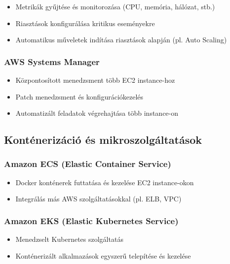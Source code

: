 \documentclass[a4paper,12pt]{article}
\begin{document}
    \begin{itemize}
        \item Metrikák gyűjtése és monitorozása (CPU, memória, hálózat, stb.)
        \item Riasztások konfigurálása kritikus eseményekre
        \item Automatikus műveletek indítása riasztások alapján (pl. Auto Scaling)
    \end{itemize}

    \subsubsection{AWS Systems Manager}

    \begin{itemize}
        \item Központosított menedzsment több EC2 instance-hoz
        \item Patch menedzsment és konfigurációkezelés
        \item Automatizált feladatok végrehajtása több instance-on
    \end{itemize}

    \subsection{Konténerizáció és mikroszolgáltatások}

    \subsubsection{Amazon ECS (Elastic Container Service)}

    \begin{itemize}
        \item Docker konténerek futtatása és kezelése EC2 instance-okon
        \item Integrálás más AWS szolgáltatásokkal (pl. ELB, VPC)
    \end{itemize}

    \subsubsection{Amazon EKS (Elastic Kubernetes Service)}

    \begin{itemize}
        \item Menedzselt Kubernetes szolgáltatás
        \item Konténerizált alkalmazások egyszerű telepítése és kezelése
    \end{itemize}
\end{document}

